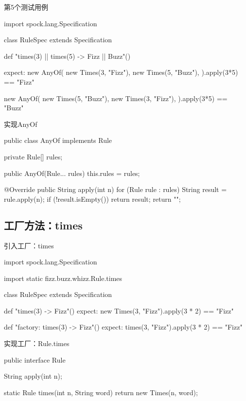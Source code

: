\begin{frame}[fragile]{第5个测试用例}
  \begin{scala}
import spock.lang.Specification

class RuleSpec extends Specification {
  def "times(3) || times(5) -> Fizz || Buzz"() {
    expect:
    new AnyOf(
        new Times(3, "Fizz"),
        new Times(5, "Buzz"),
    ).apply(3*5) == "Fizz"

    new AnyOf(
        new Times(5, "Buzz"),
        new Times(3, "Fizz"),
    ).apply(3*5) == "Buzz"    
  }
}  
  \end{scala}
\end{frame}

\begin{frame}[fragile]{实现AnyOf}
  \begin{java}
public class AnyOf implements Rule {
  private Rule[] rules;

  public AnyOf(Rule... rules) {
    this.rules = rules;
  }

  @Override
  public String apply(int n) {
    for (Rule rule : rules) {
      String result = rule.apply(n);
      if (!result.isEmpty())
        return result;
    }
    return "";
  }
}
  \end{java}
\end{frame}

\subsection{工厂方法：times}

\begin{frame}[fragile]{引入工厂：times}
  \begin{scala}
import spock.lang.Specification

import static fizz.buzz.whizz.Rule.times

class RuleSpec extends Specification {
  def "times(3) -> Fizz"() {
    expect:
    new Times(3, "Fizz").apply(3 * 2) == "Fizz"
  }

  def "factory: times(3) -> Fizz"() {
    expect:
    times(3, "Fizz").apply(3 * 2) == "Fizz"
  }
}
  \end{scala}
\end{frame}

\begin{frame}[fragile]{实现工厂：Rule.times}
  \begin{java}
public interface Rule {
  String apply(int n);

  static Rule times(int n, String word) {
    return new Times(n, word);
  }
}
  \end{java}
\end{frame}

